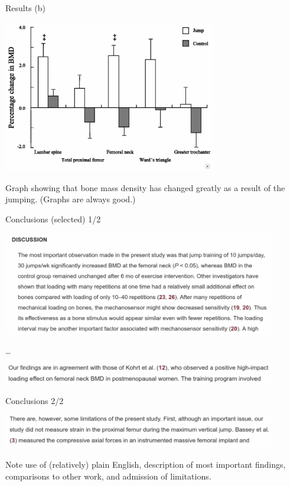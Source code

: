 \documentclass[ignorenonframetext,]{beamer}
\begin{document}
\begin{frame}{Results (b)}
\protect\hypertarget{results-b}{}

\includegraphics[width=0.7\textwidth]{resultsb}

Graph showing that bone mass density has changed greatly as a result of
the jumping. (Graphs are always good.)

\end{frame}

\begin{frame}{Conclusions (selected) 1/2}
\protect\hypertarget{conclusions-selected-12}{}

\includegraphics[width=0.9\textwidth]{conc1}

\ldots{}

\includegraphics[width=0.9\textwidth]{conc2}

\end{frame}

\begin{frame}{Conclusions 2/2}
\protect\hypertarget{conclusions-22}{}

\includegraphics[width=0.9\textwidth]{conc3}

Note use of (relatively) plain English, description of most important
findings, comparisons to other work, and admission of limitations.

\end{frame}
\end{document}
